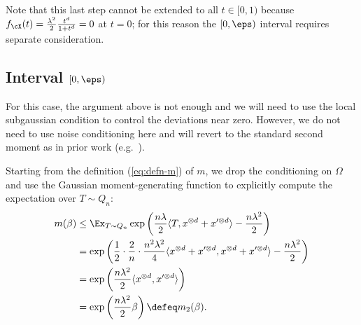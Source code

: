 \documentclass{article}
\begin{document}
Note that this last step cannot be extended to all $t \in [0,1)$ because $f_\cX(t) = \frac{\lambda^2}{2} \frac{t^d}{1+t^d} = 0$ at $t = 0$; for this reason the $[0,\eps)$ interval requires separate consideration.




\subsection{Interval $[0,\eps)$}

For this case, the argument above is not enough and we will need to use the local subgaussian condition to control the deviations near zero. However, we do not need to use noise conditioning here and will revert to the standard second moment as in prior work (e.g.\ \cite{mrz,bmvx,pwbm}).

Starting from the definition (\ref{eq:defn-m}) of $m$, we drop the conditioning on $\Omega$ and use the Gaussian moment-generating function to explicitly compute the expectation over $T \sim Q_n$:
\begin{align*}
m(\beta) &\le \Ex_{T \sim Q_n} \exp\left(\frac{n\lambda}{2} \langle T, x^{\otimes d} + x'^{\otimes d} \rangle - \frac{n\lambda^2}{2} \right) \\
&= \exp\left(\frac{1}{2}\cdot\frac{2}{n}\cdot\frac{n^2\lambda^2}{4} \langle  x^{\otimes d} + x'^{\otimes d}, x^{\otimes d} + x'^{\otimes d} \rangle - \frac{n\lambda^2}{2} \right) \\
&= \exp\left(\frac{n\lambda^2}{2} \langle x^{\otimes d}, x'^{\otimes d} \rangle \right) \\
&= \exp\left(\frac{n\lambda^2}{2} \beta \right) \defeq m_2(\beta). \\
\end{align*}
\end{document}
